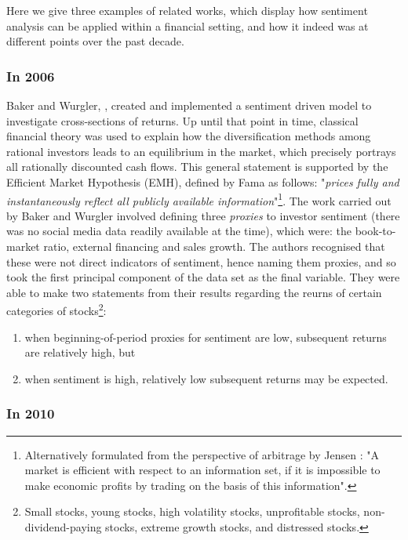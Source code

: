 \documentclass{article}
\begin{document}
Here we give three examples of related works, which display how sentiment analysis can be applied within a financial setting, and how it indeed was at different points over the past decade.


\subsubsection{In 2006}
\label{sec-4-5-1}

Baker and Wurgler, \cite{JOFI:JOFI885}, created and implemented a sentiment driven model to investigate cross-sections of returns. Up until that point in time, classical financial theory was used to explain how the diversification methods among rational investors leads to an equilibrium in the market, which precisely portrays all rationally discounted cash flows. This general statement is supported by the Efficient Market Hypothesis (EMH), defined by Fama \cite{malkiel1970efficient} as follows: "\emph{prices fully and instantaneously reflect all publicly available information}"\footnote{Alternatively formulated from the perspective of arbitrage by Jensen \cite{jensen1978some}: "A market is efficient with respect to an information set, if it is impossible to make economic profits by trading on the basis of this information".}. The work carried out by Baker and Wurgler involved defining three \emph{proxies} to investor sentiment (there was no social media data readily available at the time), which were: the book-to-market ratio, external financing and sales growth. The authors recognised that these were not direct indicators of sentiment, hence naming them proxies, and so took the first principal component of the data set as the final variable.
They were able to make two statements from their results regarding the reurns of certain categories of stocks\footnote{Small stocks, young stocks, high volatility stocks, unprofitable stocks, non-dividend-paying stocks, extreme growth stocks, and distressed stocks.}:

\begin{enumerate}
\item when beginning-of-period proxies for sentiment are low, subsequent returns are relatively high, but
\item when sentiment is high, relatively low subsequent returns may be expected.
\end{enumerate}


\subsubsection{In 2010}
\label{sec-4-5-2}
\end{document}
